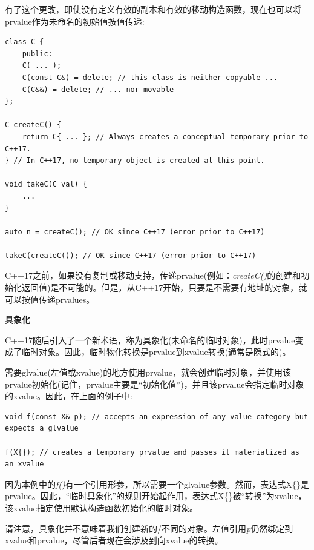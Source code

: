 有了这个更改，即使没有定义有效的副本和有效的移动构造函数，现在也可以将prvalue作为未命名的初始值按值传递:\par

\begin{lstlisting}[caption={}]
class C {
	public:
	C( ... );
	C(const C&) = delete; // this class is neither copyable ...
	C(C&&) = delete; // ... nor movable
};

C createC() {
	return C{ ... }; // Always creates a conceptual temporary prior to C++17.
} // In C++17, no temporary object is created at this point.

void takeC(C val) {
	...
}

auto n = createC(); // OK since C++17 (error prior to C++17)

takeC(createC()); // OK since C++17 (error prior to C++17)
\end{lstlisting}

C++17之前，如果没有复制或移动支持，传递prvalue(例如：\textit{createC()}的创建和初始化返回值)是不可能的。但是，从C++17开始，只要是不需要有地址的对象，就可以按值传递prvalues。\par

\hspace*{\fill} \par %
\textbf{具象化}

C++17随后引入了一个新术语，称为具象化(未命名的临时对象)，此时prvalue变成了临时对象。因此，临时物化转换是prvalue到xvalue转换(通常是隐式的)。\par

需要glvalue(左值或xvalue)的地方使用prvalue，就会创建临时对象，并使用该prvalue初始化(记住，prvalue主要是“初始化值”)，并且该prvalue会指定临时对象的xvalue。因此，在上面的例子中:\par

\begin{lstlisting}[caption={}]
void f(const X& p); // accepts an expression of any value category but expects a glvalue

f(X{}); // creates a temporary prvalue and passes it materialized as an xvalue
\end{lstlisting}

因为本例中的\textit{f()}有一个引用形参，所以需要一个glvalue参数。然而，表达式X\{\}是prvalue。因此，“临时具象化”的规则开始起作用，表达式X\{\}被“转换”为xvalue，该xvalue指定使用默认构造函数初始化的临时对象。\par

请注意，具象化并不意味着我们创建新的/不同的对象。左值引用\textit{p}仍然绑定到xvalue和prvalue，尽管后者现在会涉及到向xvalue的转换。\par






